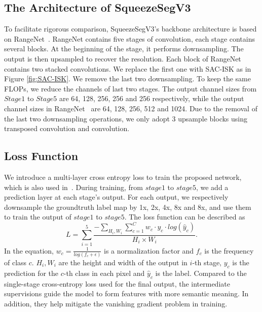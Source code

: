 \documentclass[runningheads]{llncs}
\begin{document}
\subsection{The Architecture of SqueezeSegV3}
To facilitate rigorous comparison, SqueezeSegV3's backbone architecture is based on RangeNet~\cite{milioto2019rangenet++}. RangeNet contains five stages of convolution, each stage contains several blocks. At the beginning of the stage, it performs downsampling. The output is then upsampled to recover the resolution. Each block of RangeNet contains two stacked convolutions. We replace the first one with SAC-ISK as in Figure \ref{fig:SAC-ISK}. We remove the last two downsampling. To keep the same FLOPs, we reduce the channels of last two stages. The output channel sizes from $Stage1$ to $Stage5$ are 64, 128, 256, 256 and 256 respectively, while the output channel sizes in RangeNet~\cite{milioto2019rangenet++} are 64, 128, 256, 512 and 1024. Due to the removal of the last two downsampling operations, we only adopt 3 upsample blocks using transposed convolution and convolution. 


\subsection{Loss Function}

We introduce a multi-layer cross entropy loss to train the proposed network, which is also used in~\cite{shen2017multi,johnson2016perceptual,xu2019learn,newell2016stacked}. During training, from $stage1$ to $stage5$, we add a prediction layer at each stage's output. For each output, we respectively downsample the groundtruth label map by 1x, 2x, 4x, 8x and 8x, and use them to train the output of $stage1$ to $stage5$. The loss function can be described as
\begin{equation}
    L = \sum_{i=1}^5 \frac{- \sum_{H_i, W_i} \sum_{c=1}^C w_c\cdot y_c \cdot log(\hat{y}_c)}{H_i \times W_i}.
\end{equation}
In the equation, $w_c = \frac{1}{log(f_c + \epsilon)}$ is a normalization factor and $f_c$ is the frequency of class $c$. $H_i, W_i$ are the height and width of the output in $i$-th stage, $y_c$ is the prediction for the $c$-th class in each pixel and $\hat{y}_c$ is the label. Compared to the single-stage cross-entropy loss used for the final output, the intermediate supervisions guide the model to form features with more semantic meaning. In addition, they help mitigate the vanishing gradient problem in training.
\end{document}
